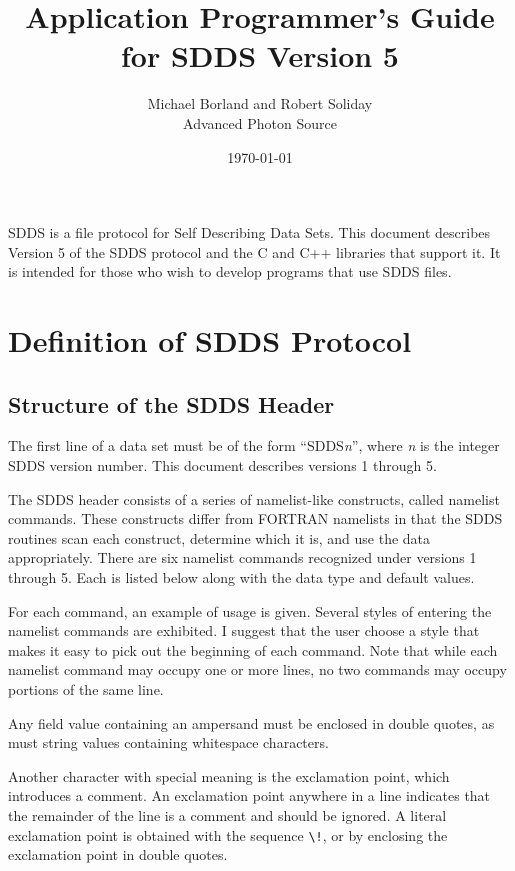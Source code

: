 \documentclass[11pt]{article}
\begin{document}
\title{Application Programmer's Guide for SDDS Version 5}
\author{Michael Borland and Robert Soliday\\Advanced Photon Source\\ \date{\today}}
\maketitle

SDDS is a file protocol for Self Describing Data Sets. This document describes Version 5 of the SDDS protocol and the C and C++ libraries that support it. It is intended for those who wish to develop programs that use SDDS files.

\section{Definition of SDDS Protocol}

\subsection{Structure of the SDDS Header}
\label{sect:header}

The first line of a data set must be of the form ``SDDS{\em n}'', where {\em n} is the integer SDDS version number. This document describes versions 1 through 5.

The SDDS header consists of a series of namelist-like constructs, called namelist commands.  These constructs differ from FORTRAN namelists in that the SDDS routines scan each construct, determine which it is, and use the data appropriately. There are six namelist commands recognized under versions 1 through 5.  Each is listed below along with the data type and default values.

For each command, an example of usage is given.  Several styles of entering the namelist commands are exhibited.  I suggest that the user choose a style that makes it easy to pick out the beginning of each command.  Note that while each namelist command may occupy one or more lines, no two commands may occupy portions of the same line.

Any field value containing an ampersand must be enclosed in double quotes, as must string values containing whitespace characters.

Another character with special meaning is the exclamation point, which introduces a comment.  An exclamation point anywhere in a line indicates that the remainder of the line is a comment and should be ignored.  A literal exclamation point is obtained with the sequence \verb|\!|, or by enclosing the exclamation point in double quotes.
\end{document}
